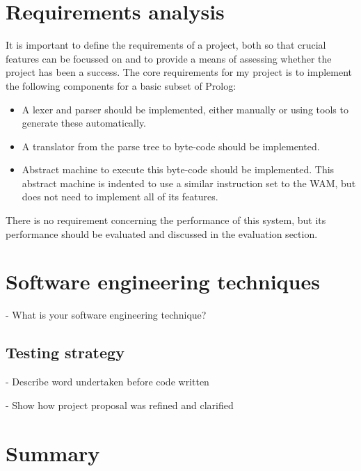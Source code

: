 \documentclass[12pt,a4paper]{report}
\begin{document}
\section{Requirements analysis}

It is important to define the requirements of a project, both so that crucial features can be focussed on and to provide a means of assessing whether the project has been a success. The core requirements for my project is to implement the following components for a basic subset of Prolog:
\begin{itemize}
\item A lexer and parser should be implemented, either manually or using tools to generate these automatically.
\item A translator from the parse tree to byte-code should be implemented.
\item Abstract machine to execute this byte-code should be implemented. This abstract machine is indented to use a similar instruction set to the WAM, but does not need to implement all of its features.
\end{itemize}
There is no requirement concerning the performance of this system, but its performance should be evaluated and discussed in the evaluation section.


\section{Software engineering techniques}

- What is your software engineering technique? 

\subsection{Testing strategy}

\hrulefill

- Describe word undertaken before code written

- Show how project proposal was refined and clarified 


\section{Summary}
\end{document}
